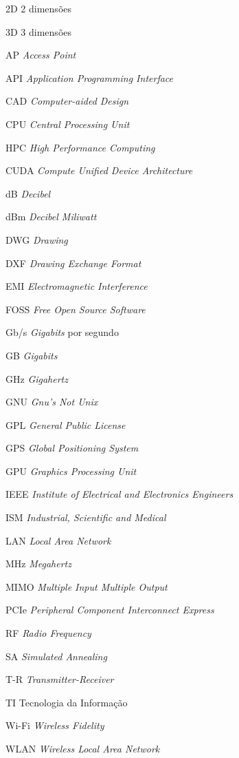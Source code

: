 \documentclass[
	12pt,				%
	twoside,			%
	a4paper,			%
	english,			%
	french,				%
	spanish,			%
	brazil				%
	]{abntex2}
\begin{document}
\begin{siglas}
  \item[2D] 2 dimensões
  \item[3D] 3 dimensões
  \item[AP] \emph{Access Point}
  \item[API] \emph{Application Programming Interface}
  \item[CAD] \emph{Computer-aided Design}
  \item[CPU] \emph{Central Processing Unit}
  \item[HPC] \emph{High Performance Computing}
  \item[CUDA] \emph{Compute Unified Device Architecture}
  \item[dB] \emph{Decibel}
  \item[dBm] \emph{Decibel Miliwatt}
  \item[DWG] \emph{Drawing}
  \item[DXF] \emph{Drawing Exchange Format}
  \item[EMI] \emph{Electromagnetic Interference}
  \item[FOSS] \emph{Free Open Source Software}
  \item[Gb/s] \emph{Gigabits} por segundo
  \item[GB] \emph{Gigabits}
  \item[GHz] \emph{Gigahertz}
  \item[GNU] \emph{Gnu's Not Unix}
  \item[GPL] \emph{General Public License}
  \item[GPS] \emph{Global Positioning System}
  \item[GPU] \emph{Graphics Processing Unit}
  \item[IEEE] \emph{Institute of Electrical and Electronics Engineers}
  \item[ISM] \emph{Industrial, Scientific and Medical}
  \item[LAN] \emph{Local Area Network}
  \item[MHz] \emph{Megahertz}
  \item[MIMO] \emph{Multiple Input Multiple Output}
  \item[PCIe] \emph{Peripheral Component Interconnect Express}
  \item[RF] \emph{Radio Frequency}
  \item[SA] \emph{Simulated Annealing}
  \item[T-R] \emph{Transmitter-Receiver}
  \item[TI] Tecnologia da Informação
  \item[Wi-Fi] \emph{Wireless Fidelity}
  \item[WLAN] \emph{Wireless Local Area Network}
\end{siglas}
\end{document}
